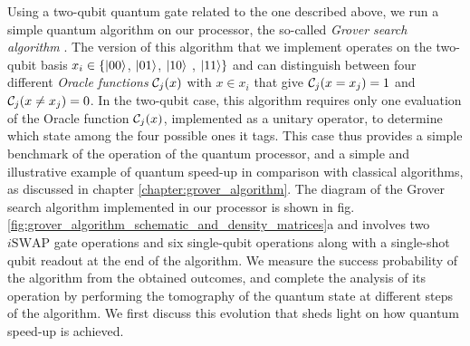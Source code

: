 Using a two-qubit quantum gate related to the one
described above, we run a simple quantum algorithm on our processor,
the so-called \textit{Grover search algorithm} \citep{Grover_Quantum_1997}.
The version of this algorithm that we implement operates on the
two-qubit basis $x_{i}\in\{\left| 00 \right>$, $\left| 01 \right>$, $\left| 10 \right>$
, $\left| 11 \right>\}$ and can distinguish between four different \textit{Oracle
functions} $\Or_{j}(x)$ with $x\in x_{i}$ that give $\Or_j(x=x_j)=1$ and $\Or_j(x \ne x_j)=0$. In the two-qubit case, this algorithm requires only
one evaluation of the Oracle function $\Or_j(x)$, implemented as a unitary operator,
to determine which state among the four possible ones it tags. This
case thus provides a simple benchmark of the operation of the quantum
processor, and a simple and illustrative example of quantum speed-up
in comparison with classical algorithms, as discussed
in chapter \ref{chapter:grover_algorithm}. The diagram of the Grover search algorithm implemented
in our processor is shown in fig. \ref{fig:grover_algorithm_schematic_and_density_matrices}a
and involves two $i\mathrm{SWAP}$ gate operations and six single-qubit
operations along with a single-shot qubit readout at the end of the
algorithm. We measure the success probability of the algorithm from
the obtained outcomes, and complete the analysis of its operation
by performing the tomography of the quantum state at different steps
of the algorithm. We first discuss this evolution that sheds light
on how quantum speed-up is achieved.

